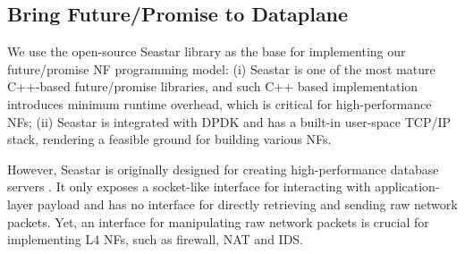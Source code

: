 



\subsection{Bring Future/Promise to Dataplane}


We use the open-source Seastar \cite{seastar} library as the base for implementing our future/promise NF programming model: (i) Seastar is one of the most mature C++-based future/promise libraries, and such C++ based implementation introduces minimum runtime overhead, which is critical for high-performance NFs; (ii) Seastar is integrated with DPDK and has a built-in user-space TCP/IP stack, rendering a feasible ground for building various NFs.

However, Seastar is originally designed for creating high-performance database servers \cite{scylladb}. %
 It only exposes a socket-like interface for interacting with application-layer payload and has no interface for directly retrieving and sending raw network packets. Yet, an interface for manipulating raw network packets is crucial for implementing L4 NFs, such as firewall, NAT and IDS.

